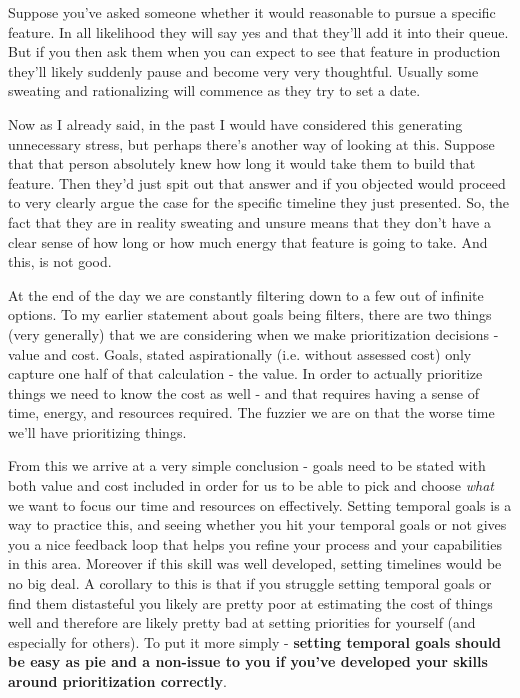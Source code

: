 \documentclass[10pt,a5paper]{book}
\begin{document}
Suppose you've asked someone whether it would reasonable to pursue a specific feature. In all likelihood they will say yes and that they'll add it into their queue. But if you then ask them when you can expect to see that feature in production they'll likely suddenly pause and become very very thoughtful. Usually some sweating and rationalizing will commence as they try to set a date. 

Now as I already said, in the past I would have considered this generating unnecessary stress, but perhaps there's another way of looking at this. Suppose that that person absolutely knew how long it would take them to build that feature. Then they'd just spit out that answer and if you objected would proceed to very clearly argue the case for the specific timeline they just presented. So, the fact that they are in reality sweating and unsure means that they don't have a clear sense of how long or how much energy that feature is going to take. And this, is not good. 

At the end of the day we are constantly filtering down to a few out of infinite options. To my earlier statement about goals being filters, there are two things (very generally) that we are considering when we make prioritization decisions - value and cost. Goals, stated aspirationally (i.e. without assessed cost) only capture one half of that calculation - the value. In order to actually prioritize things we need to know the cost as well - and that requires having a sense of time, energy, and resources required. The fuzzier we are on that the worse time we'll have prioritizing things.

From this we arrive at a very simple conclusion - goals need to be stated with both value and cost included in order for us to be able to pick and choose \textit{what} we want to focus our time and resources on effectively. Setting temporal goals is a way to practice this, and seeing whether you hit your temporal goals or not gives you a nice feedback loop that helps you refine your process and your capabilities in this area. Moreover if this skill was well developed, setting timelines would be no big deal. A corollary to this is that if you struggle setting temporal goals or find them distasteful you likely are pretty poor at estimating the cost of things well and therefore are likely pretty bad at setting priorities for yourself (and especially for others). To put it more simply - \textbf{setting temporal goals should be easy as pie and a non-issue to you if you've developed your skills around prioritization correctly}. 
\end{document}
